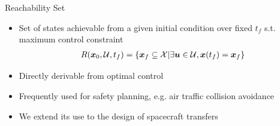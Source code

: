 \begin{frame}{Reachability Set}

\begin{itemize}
    \item Set of states achievable from a given initial condition over fixed \( t_f \) s.t. maximum control constraint
    \begin{align*}
        R( \bm{x}_0, \mathcal{U} , t_f) = \left\{  \bm{x}_f \subseteq \mathcal{X} | \exists \bm{u} \in \mathcal{U}, \bm{x}(t_f) = \bm{x}_f  \right\}
    \end{align*}
    \pause
    \item Directly derivable from optimal control
    \item Frequently used for safety planning, e.g. air traffic collision avoidance
    \pause
    \item We extend its use to the design of spacecraft transfers
\end{itemize}

\end{frame}

